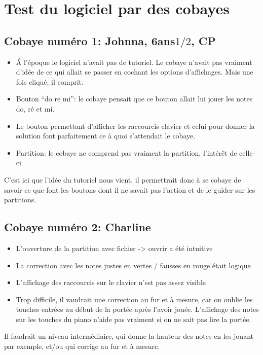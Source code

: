 \documentclass{article}
\begin{document}
\section{Test du logiciel par des cobayes}
\subsection{Cobaye numéro 1: Johnna, 6ans$1/2$, CP}

\begin{itemize}
\item \'A l'époque le logiciel n'avait pas de tutoriel. Le cobaye n'avait pas vraiment d'idée de ce qui allait se passer en cochant les 
options d'affichages. Mais une fois cliqué, il comprit.
\item Bouton ``do re mi'': le cobaye pensait que ce bouton allait lui jouer les notes do, ré et mi.
\item Le bouton permettant d'afficher les raccourcis clavier et celui pour donner la solution font parfaitement ce à quoi s'attendait
le cobaye.
\item Partition: le cobaye ne comprend pas vraiment la partition, l'intérêt de celle-ci
\end{itemize}

C'est ici que l'idée du tutoriel nous vient, il permettrait donc à se cobaye de savoir ce que font les boutons dont il ne savait pas
l'action et de le guider sur les partitions.

\subsection{Cobaye numéro 2: Charline}

\begin{itemize}
\item L'ouverture de la partition avec fichier -> ouvrir a été intuitive
\item La correction avec les notes justes en vertes / fausses en rouge était logique
\item L'affichage des raccourcis sur le clavier n'est pas assez visible
\item Trop difficile, il vaudrait une correction au fur et à mesure, car on oublie les touches entrées au début de la portée après l'avoir jouée. L'affichage des notes sur les touches du piano n'aide pas vraiment si on ne sait pas lire la portée. 
\end{itemize}

Il faudrait un niveau intermédiaire, qui donne la hauteur des notes en les jouant par exemple, et/ou qui corrige au fur et à mesure.
\end{document}
